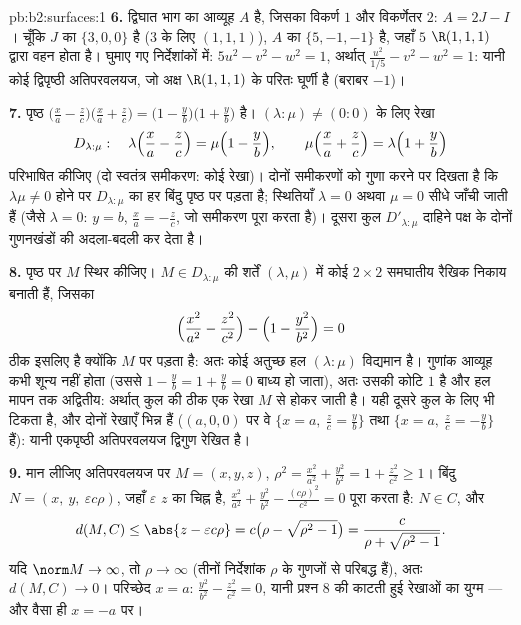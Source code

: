 \begin{solution}{pb:b2:surfaces:1}
\textbf{6.} द्विघात भाग का आव्यूह $A$ है, जिसका विकर्ण $1$ और
विकर्णेतर $2$: $A = 2J - I$। चूँकि $J$ का  $\{3, 0, 0\}$ है ($3$ के लिए
 $(1,1,1)$), $A$ का  $\{5, -1, -1\}$ है, जहाँ  $5$ $\R(1,1,1)$ द्वारा वहन होता है। घुमाए गए निर्देशांकों में:
$5u^2 - v^2 - w^2 =
1$, अर्थात् $\frac{u^2}{1/5} - v^2 - w^2 = 1$: यानी कोई द्विपृष्ठी अतिपरवलयज, जो अक्ष $\R(1,1,1)$
के परितः घूर्णी है (बराबर  $-1$)।

\textbf{7.} पृष्ठ $\bigl(\frac xa - \frac
zc\bigr)\bigl(\frac xa + \frac zc\bigr) = \bigl(1 - \frac
yb\bigr)\bigl(1 + \frac yb\bigr)$ है। $(\lambda : \mu) \neq
(0:0)$ के लिए रेखा
\[
D_{\lambda:\mu} :\quad
\lambda\Bigl(\frac xa - \frac zc\Bigr) = \mu\Bigl(1 - \frac
yb\Bigr), \qquad
\mu\Bigl(\frac xa + \frac zc\Bigr) = \lambda\Bigl(1 + \frac
yb\Bigr)
\]
परिभाषित कीजिए (दो स्वतंत्र  समीकरण: कोई रेखा)। दोनों समीकरणों
को गुणा करने पर दिखता है कि $\lambda\mu \neq 0$ होने पर $D_{\lambda:\mu}$ का हर बिंदु पृष्ठ पर
पड़ता है; स्थितियाँ $\lambda = 0$ अथवा $\mu = 0$ सीधे जाँची जाती हैं (जैसे $\lambda = 0$:
$y =
b$, $\frac xa = -\frac zc$, जो समीकरण पूरा करता है)। दूसरा कुल $D'_{\lambda:\mu}$ दाहिने पक्ष के
दोनों गुणनखंडों की अदला-बदली कर देता है।

\textbf{8.} पृष्ठ पर $M$ स्थिर कीजिए। $M \in
D_{\lambda:\mu}$ की शर्तें $(\lambda, \mu)$ में कोई
$2\times2$ समघातीय रैखिक निकाय बनाती हैं, जिसका 
\[
\Bigl(\frac{x^2}{a^2} - \frac{z^2}{c^2}\Bigr) - \Bigl(1 -
\frac{y^2}{b^2}\Bigr) = 0
\]
ठीक इसलिए है क्योंकि $M$  पर पड़ता है: अतः कोई अतुच्छ हल
$(\lambda : \mu)$ विद्यमान है। गुणांक आव्यूह कभी शून्य नहीं होता (उससे $1 - \frac yb = 1 + \frac yb =
0$
बाध्य हो जाता), अतः उसकी कोटि $1$ है और हल मापन तक अद्वितीय:
अर्थात् कुल की ठीक एक रेखा $M$ से होकर जाती है। यही दूसरे कुल के
लिए भी टिकता है, और दोनों रेखाएँ भिन्न हैं ($(a, 0, 0)$ पर वे $\{x = a,\ \frac zc = \frac
yb\}$ तथा
$\{x = a,\ \frac zc = -\frac yb\}$ हैं): यानी एकपृष्ठी अतिपरवलयज द्विगुण रेखित है।

\textbf{9.} मान लीजिए अतिपरवलयज पर $M = (x, y, z)$, $\rho^2 =
\frac{x^2}{a^2} + \frac{y^2}{b^2} = 1 + \frac{z^2}{c^2} \geq
1$। बिंदु $N = (x,\ y,\ \varepsilon c\rho)$, जहाँ
$\varepsilon$ $z$ का चिह्न है, $\frac{x^2}{a^2} +
\frac{y^2}{b^2} - \frac{(c\rho)^2}{c^2} = 0$ पूरा करता है: $N \in C$, और
\[
d(M, C) \leq \abs{z - \varepsilon c\rho}
= c\bigl(\rho - \sqrt{\rho^2 - 1}\bigr)
= \frac{c}{\rho + \sqrt{\rho^2 - 1}} .
\]
यदि $\norm M \to \infty$, तो $\rho \to \infty$ (तीनों निर्देशांक $\rho$ के गुणजों से परिबद्ध
हैं), अतः $d(M, C)
\to 0$। परिच्छेद $x = a$: $\frac{y^2}{b^2} -
\frac{z^2}{c^2} = 0$, यानी प्रश्न 8 की काटती हुई
रेखाओं का युग्म --- और वैसा ही $x = -a$ पर।


\end{solution}
